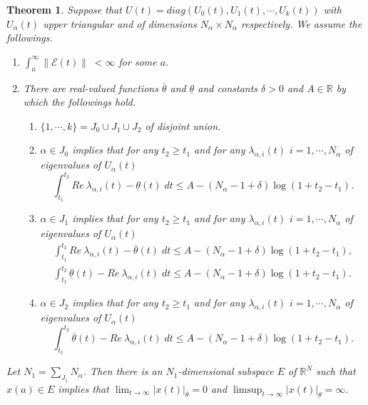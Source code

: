 \documentclass[a4paper,11pt]{article}
\newcommand{\upl}{\overline{\lambda}}
\newcommand{\udl}{\underline{\lambda}}
\newcommand{\tl}{{\underline{\theta}}}
\newcommand{\tu}{{\overline{\theta}}}
\newcommand{\E}{\mathcal{E}}
\newcounter{Theorem}
\newtheorem{theorem}[Theorem]{Theorem}
\theoremstyle{remark}
\begin{document}
\begin{theorem} Suppose that $U(t)=diag(U_0(t),U_1(t),\cdots,U_k(t))$ with $U_\alpha(t)$ upper triangular and of dimensions $N_\alpha\times N_\alpha$ respectively. We assume the followings.%
\begin{enumerate}
 \item $\int_a^\infty \|\E(t)\| \; < \infty$ for some $a$.
 \item There are real-valued functions $\tu$ and $\tl$ and constants $\delta >0$ and $A\in \mathbb{R}$ by which the followings hold.
 \begin{enumerate}
  \item $\{1,\cdots,k\}=J_0 \cup J_1 \cup J_2$ of disjoint union. %
  \item $\alpha \in J_0$ implies that for any $t_2\ge t_1$ and for any $\lambda_{\alpha,i}(t)$ $i=1,\cdots,N_\alpha$ of eigenvalues of $U_\alpha(t)$ 
  $$ \int_{t_1}^{t_2} Re\: \lambda_{\alpha,i}(t) - \tl(t) \; dt \le A -(N_\alpha -1 +\delta)\log(1+t_2-t_1).$$
  \item $\alpha \in J_1$ implies that for any $t_2\ge t_1$ and for any $\lambda_{\alpha,i}(t)$ $i=1,\cdots,N_\alpha$ of eigenvalues of $U_\alpha(t)$ 
  \begin{align*}
     \int_{t_1}^{t_2} Re\: \lambda_{\alpha,i}(t) - \tu(t) \; dt \le A -(N_\alpha -1 +\delta)\log(1+t_2-t_1),\\
     \int_{t_1}^{t_2} \tl(t)- Re\: \lambda_{\alpha,i}(t) \; dt \le A -(N_\alpha -1 +\delta)\log(1+t_2-t_1).
  \end{align*}
  \item $\alpha \in J_2$ implies that for any $t_2\ge t_1$ and for any $\lambda_{\alpha,i}(t)$ $i=1,\cdots,N_\alpha$ of eigenvalues of $U_\alpha(t)$
  $$ \int_{t_1}^{t_2} \tu(t)- Re\: \lambda_{\alpha,i}(t) \; dt \le A -(N_\alpha -1 +\delta)\log(1+t_2-t_1).$$
 \end{enumerate}
\end{enumerate}
 Let $\displaystyle N_1 = \sum_{J_1} N_\alpha$. Then there is an $N_1$-dimensional subspace $E$ of $\mathbb{R}^N$ such that $x(a) \in E$ implies that $\displaystyle \lim_{t \rightarrow \infty} |x(t)|_\tu =0$ and $\displaystyle \limsup_{t \rightarrow \infty}|x(t)|_\tl = \infty$.
\end{theorem}
\end{document}
